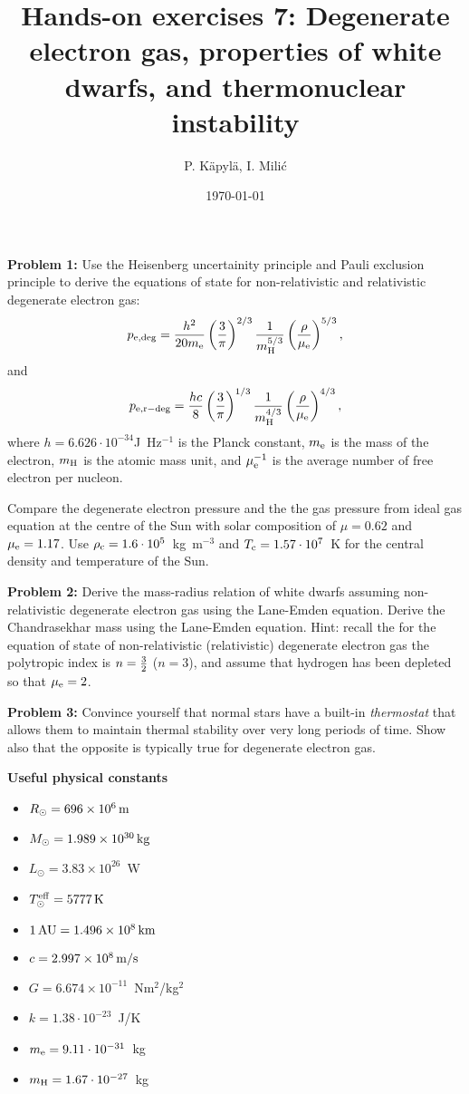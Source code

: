 \documentclass[12pt]{article}
\title{Hands-on exercises 7: Degenerate electron gas, properties of white dwarfs, and thermonuclear instability}
\author{P. K\"{a}pyl\"{a}, I. Mili\'{c}}
\date{\today}
\begin{document}
\maketitle

{\bf Problem 1:} Use the Heisenberg uncertainity principle and Pauli
exclusion principle to derive the equations of state for
non-relativistic and relativistic degenerate electron gas:
\begin{equation}
p_{\rm e,deg} = \frac{h^2}{20 m_{\rm e}} \left(\frac{3}{\pi} \right)^{2/3} \frac{1}{m_{\rm H}^{5/3}} \left( \frac{\rho}{\mu_{\rm e}} \right)^{5/3},
\end{equation}
and 
\begin{equation}
p_{\rm e,r-deg} = \frac{hc}{8} \left(\frac{3}{\pi} \right)^{1/3} \frac{1}{m_{\rm H}^{4/3}} \left( \frac{\rho}{\mu_{\rm e}} \right)^{4/3},
\end{equation}
where $h = 6.626\cdot 10^{-34}$J~Hz$^{-1}$ is the Planck constant,
$m_{\rm e}$ is the mass of the electron, $m_{\rm H}$ is the atomic
mass unit, and $\mu_{\rm e}^{-1}$ is the average number of free
electron per nucleon.

Compare the degenerate electron pressure and the the gas pressure from
ideal gas equation at the centre of the Sun with solar composition of
$\mu=0.62$ and $\mu_{\rm e} = 1.17$. Use $\rho_{\rm c} = 1.6\cdot
10^5$~kg~m$^{-3}$ and $T_{\rm c} = 1.57\cdot 10^7$~K for the central
density and temperature of the Sun.

{\bf Problem 2:} Derive the mass-radius relation of white dwarfs
assuming non-relativistic degenerate electron gas using the Lane-Emden
equation. Derive the Chandrasekhar mass using the Lane-Emden
equation. Hint: recall the for the equation of state of
non-relativistic (relativistic) degenerate electron gas the polytropic
index is $n={3 \over 2}$ ($n=3$), and assume that hydrogen has been
depleted so that $\mu_{\rm e} = 2$.

{\bf Problem 3:} Convince yourself that normal stars have a built-in
\emph{thermostat} that allows them to maintain thermal stability over
very long periods of time. Show also that the opposite is typically
true for degenerate electron gas.


{\bf Useful physical constants}
\begin{itemize}
  \item $R_{\odot} = 696 \times 10^6\,{\rm m}$
  \item $M_{\odot} = 1.989 \times 10^{30}\,{\rm kg}$
  \item $L_{\odot} = 3.83 \times 10^{26}$~W
  \item $T^{\rm eff}_{\odot} = 5777\,{\rm K}$
  \item $1\,{\rm AU} = 1.496 \times 10^8\,{\rm km}$
  \item $c = 2.997 \times 10^8\,{\rm m/s}$
  \item $G = 6.674 \times 10^{-11}$~Nm$^2$/kg$^2$
  \item $k = 1.38\cdot10^{-23}$~J/K
  \item $m_{\rm e} = 9.11\cdot10^{-31}$~kg
  \item $m_{\rm H} = 1.67\cdot10^{-27}$~kg
\end{itemize}
\end{document}
